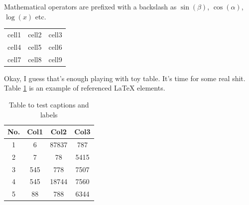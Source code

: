 \documentclass[12pt, letterpaper, oneside]{report}
\begin{document}
Mathematical operators are prefixed with a backslash as $\sin(\beta)$, $\cos(\alpha)$, $\log(x)$ etc.

\begin{center}
\begin{tabular}{ |c|c|c| }
    \hline
    cell1 & cell2 & cell3 \\
    cell4 & cell5 & cell6 \\
    cell7 & cell8 & cell9 \\
    \hline
\end{tabular}
\end{center}

Okay, I guess that's enough playing with toy table. It's time for some real shit. Table \ref{table:data} is an example of referenced \LaTeX{} elements.

\begin{table}[h!]
    \centering
    \begin{tabular}{ ||c|c c c|| }
        \hline
        No. & Col1 & Col2 & Col3 \\ [0.5ex]
        \hline \hline
        1 & 6 & 87837 & 787 \\
        2 & 7 & 78 & 5415 \\
        3 & 545 & 778 & 7507 \\
        4 & 545 & 18744 & 7560 \\
        5 & 88 & 788 & 6344 \\ [1ex]
        \hline
    \end{tabular}
    \caption{Table to test captions and labels}
    \label{table:data}
\end{table}
\end{document}
